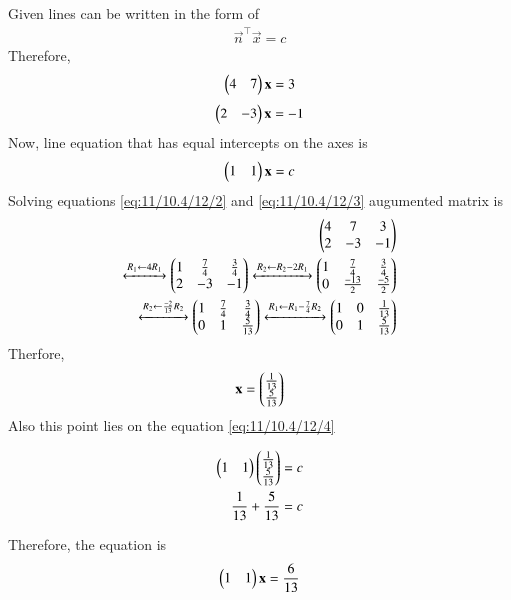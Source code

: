 Given lines can be written in the form of \begin{align}
        \Vec{n}^{\top}\Vec{x} = c
    \end{align}
   Therefore,
		\begin{align}
       \myvec{4&7}\vec{x}=3
       \label{eq:11/10.4/12/2}
   \end{align} 
   \begin{align}
       \myvec{2&-3}\vec{x}=-1
       \label{eq:11/10.4/12/3}
   \end{align}
   Now, line equation that has equal intercepts on the axes is
   \begin{align}
       \myvec{1 & 1}\Vec{x}=c
       \label{eq:11/10.4/12/4}
   \end{align}
   Solving equations \eqref{eq:11/10.4/12/2} and \eqref{eq:11/10.4/12/3}
		augumented matrix is
 \begin{align}
    \begin{pmatrix}4&7&3\\2&-3&-1\end{pmatrix}\\
    \xleftrightarrow{R_1 \leftarrow 4 R_1}
    \begin{pmatrix}1&\frac{7}{4}&\frac{3}{4}\\2&-3&-1\end{pmatrix}
    \xleftrightarrow{R_2 \leftarrow R_2 - 2R_1}
    \begin{pmatrix}1&\frac{7}{4}&\frac{3}{4}\\0&\frac{-13}{2}&\frac{-5}{2}\end{pmatrix}\\
    \xleftrightarrow{R_2 \leftarrow \frac{-2}{13}R_2}
    \begin{pmatrix}1&\frac{7}{4}&\frac{3}{4}\\0&1&\frac{5}{13}\end{pmatrix}
    \xleftrightarrow{R_1 \leftarrow R_1-\frac{7}{4}R_2}
    \begin{pmatrix}1&0&\frac{1}{13}\\0&1&\frac{5}{13}\end{pmatrix}
\end{align}
Therfore, \begin{align}    
\mathbf{x} = \begin{pmatrix}\frac{1}{13}\\\frac{5}{13}\end{pmatrix}
\end{align}
Also this point lies on the equation \eqref{eq:11/10.4/12/4}
\begin{center}
\begin{align}
    \begin{pmatrix}1 & 1\end{pmatrix}\begin{pmatrix}\frac{1}{13}\\\frac{5}{13}\end{pmatrix} = c\\
    \frac{1}{13}+\frac{5}{13} = c
    \end{align}
    \end{center}
    Therefore, the equation is \begin{align}
        \myvec{1&1}\Vec{x}=\frac{6}{13}
    \end{align}
